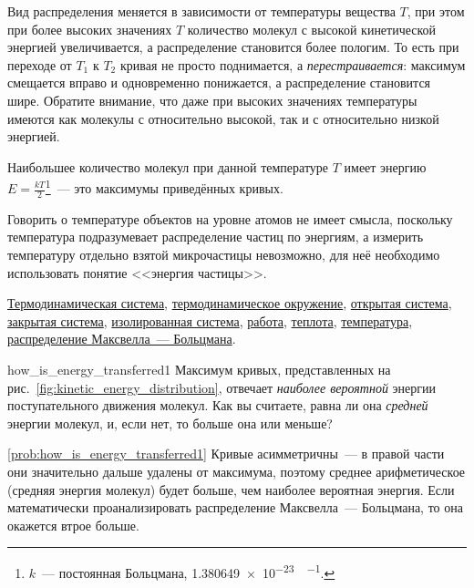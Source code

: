 Вид распределения меняется в зависимости от температуры вещества $T$, при этом при более высоких значениях $T$ количество молекул с высокой кинетической энергией увеличивается, а распределение становится более пологим. То есть при переходе от $T_1$ к $T_2$ кривая не просто поднимается, а \emph{перестраивается}: максимум смещается вправо и одновременно понижается, а распределение становится шире. Обратите внимание, что даже при высоких значениях температуры имеются как молекулы с относительно высокой, так и с относительно низкой энергией.

Наибольшее количество молекул при данной температуре $T$ имеет энергию $E = \frac{kT}{2}$\footnote{$k$~--- постоянная Больцмана, \qty{1,380649e-23}{\ruJ\per\ruK}.}~--- это максимумы приведённых кривых.

Говорить о температуре объектов на уровне атомов не имеет смысла, поскольку температура подразумевает распределение частиц по энергиям, а измерить температуру отдельно взятой микрочастицы невозможно, для неё необходимо использовать понятие <<энергия частицы>>.

\begin{termlist}
    \hyperref[term:thermodynamic_system]{Термодинамическая система},
    \hyperref[term:thermodynamic_environment]{термодинамическое окружение},
    \hyperref[term:open_system]{открытая система},
    \hyperref[term:closed_system]{закрытая система},
    \hyperref[term:isolated_system]{изолированная система},
    \hyperref[term:work]{работа},
    \hyperref[term:heat]{теплота},
    \hyperref[term:temperature]{температура},
    \hyperref[term:Maxwell-Boltzmann_distribution]{распределение Максвелла~--- Больцмана}.
\end{termlist}

\begin{problem}{}{how_is_energy_transferred1}
    Максимум кривых, представленных на рис.~\ref{fig:kinetic_energy_distribution}, отвечает \emph{наиболее вероятной} энергии поступательного движения молекул. Как вы считаете, равна ли она \emph{средней} энергии молекул, и, если нет, то больше она или меньше?
    \begin{sol}{\ref{prob:how_is_energy_transferred1}}
        Кривые асимметричны~--- в правой части они значительно дальше удалены от максимума, поэтому среднее арифметическое (средняя энергия молекул) будет больше, чем наиболее вероятная энергия. Если математически проанализировать распределение Максвелла~--- Больцмана, то она окажется втрое больше.
    \end{sol}
\end{problem}

